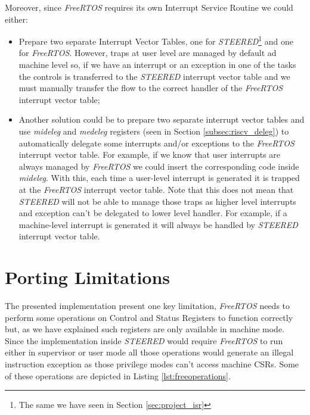 Moreover, since \textit{FreeRTOS} requires its own Interrupt Service Routine we could
either:
\begin{itemize}
  \item Prepare two separate Interrupt Vector Tables, one for \textit{STEERED}\footnote{The
    same we have seen in Section \ref{sec:project_isr}} and one for \textit{FreeRTOS}.
    However, traps at user level are managed by default ad machine level so, if
    we have an interrupt or an exception in one of the tasks the controls is
    transferred to the \textit{STEERED} interrupt vector table and we must manually
    transfer the flow to the correct handler of the \textit{FreeRTOS} interrupt
    vector table;

  \item Another solution could be to prepare two separate interrupt vector tables
    and use \textit{mideleg} and \textit{medeleg} registers (seen in Section
    \ref{subsec:riscv_deleg}) to automatically delegate some interrupts and/or exceptions
    to the \textit{FreeRTOS} interrupt vector table. For example, if we know
    that user interrupts are always managed by \textit{FreeRTOS} we could insert
    the corresponding code inside \textit{mideleg}. With this, each time a user-level
    interrupt is generated it is trapped at the \textit{FreeRTOS} interrupt vector
    table. Note that this does not mean that \textit{STEERED} will not be able to
    manage those traps as higher level interrupts and exception can't be delegated
    to lower level handler. For example, if a machine-level interrupt is generated
    it will always be handled by \textit{STEERED} interrupt vector table.
\end{itemize}

\section{Porting Limitations}
\label{sec:rtos_limitations}

The presented implementation present one key limitation, \textit{FreeRTOS} needs
to perform some operations on Control and Status Registers to function correctly
but, as we have explained such registers are only available in machine mode.
Since the implementation inside \textit{STEERED} would require \textit{FreeRTOS}
to run either in supervisor or user mode all those operations would generate an
illegal instruction exception as those privilege modes can't access machine CSRs.
Some of these operations are depicted in Listing \ref{lst:freeoperations}.

